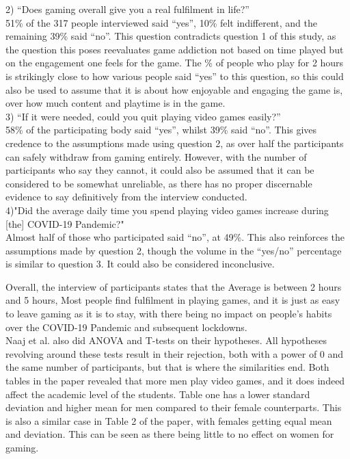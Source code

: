 \documentclass[conference]{IEEEtran}
\begin{document}
2) “Does gaming overall give you a real fulfilment in life?”\\

51\% of the 317 people interviewed said “yes”, 10\% felt indifferent, and the remaining 39\% said “no”. This question contradicts question 1 of this study, as the question this poses reevaluates game addiction not based on time played but on the engagement one feels for the game. The \% of people who play for 2 hours is strikingly close to how various people said “yes” to this question, so this could also be used to assume that it is about how enjoyable and engaging the game is, over how much content and playtime is in the game.\\

3) “If it were needed, could you quit playing video games easily?”\\

58\% of the participating body said “yes”, whilst 39\% said “no”. This gives credence to the assumptions made using question 2, as over half the participants can safely withdraw from gaming entirely. However, with the number of participants who say they cannot, it could also be assumed that it can be considered to be somewhat unreliable, as there has no proper discernable evidence to say definitively from the interview conducted.\\

4)"Did the average daily time you spend playing video games increase during [the] COVID-19 Pandemic?"\\

Almost half of those who participated said “no”, at 49\%. This also reinforces the assumptions made by question 2, though the volume in the “yes/no” percentage is similar to question 3. It could also be considered inconclusive.

Overall, the interview of participants states that the Average is between 2 hours and 5 hours, Most people find fulfilment in playing games, and it is just as easy to leave gaming as it is to stay, with there being no impact on people’s habits over the COVID-19 Pandemic and subsequent lockdowns.\\

Naaj et al. also did ANOVA and T-tests on their hypotheses. All hypotheses revolving around these tests result in their rejection, both with a power of 0 and the same number of participants, but that is where the similarities end. Both tables in the paper revealed that more men play video games, and it does indeed affect the academic level of the students. Table one has a lower standard deviation and higher mean for men compared to their female counterparts. This is also a similar case in Table 2 of the paper, with females getting equal mean and deviation. This can be seen as there being little to no effect on women for gaming.\\
\end{document}
